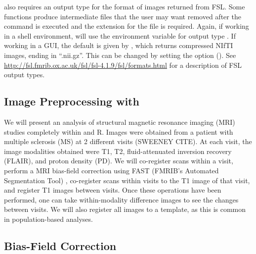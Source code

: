  also requires an output type for the format of images returned from FSL.  Some  functions produce intermediate files that the user may want removed after the command is executed and the extension for the file is required.  Again, if working in a shell environment,  will use the environment variable for output type .  If working in a GUI, the default is given by , which returns compressed NIfTI images, ending in ``.nii.gz''.  This can be changed by setting the  option ().  See \url{http://fsl.fmrib.ox.ac.uk/fsl/fsl-4.1.9/fsl/formats.html} for a description of FSL output types.

\begin{knitrout}
\color{fgcolor}\begin{kframe}
\begin{alltt}
\hlstd{(}\hlstd{=}\hlstd{)}
\hlstd{(} \hlstd{=} \hlstd{)}
\end{alltt}
\end{kframe}
\end{knitrout}

\subsection{Image Preprocessing with }

We will present an analysis of structural magnetic resonance imaging (MRI) studies completely within  and R.  Images were obtained from a patient with multiple sclerosis (MS) at 2 different visits (SWEENEY CITE).  At each visit, the image modalities obtained were T1, T2, fluid-attenuated inversion recovery (FLAIR), and proton density (PD). We will co-register scans within a visit, perform a MRI bias-field correction using FAST (FMRIB's Automated Segmentation Tool) \citep{zhang_segmentation_2001}, co-register scans within visits to the T1 image of that visit, and register T1 images between visits.  Once these operations have been performed, one can take within-modality difference images to see the changes between visits.  We will also register all images to a template, as this is common in population-based analyses.

\subsection{Bias-Field Correction}

